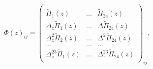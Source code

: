 \begin{equation}
\label{eq:Phidieuf2}
\Phi(z)_{ij}=\left(\begin{array}{ccc}\\
\tilde{\Pi}_1(z) & ... & \tilde{\Pi}_{24}(z) \\
\Delta_z \tilde{\Pi}_1(z) & ... & \Delta \tilde{\Pi}_{24}(z) \\
\Delta_z^2 \tilde{\Pi}_2(z) & ... & \Delta^2 \tilde{\Pi}_{24}(z) \\
... & ... & ... \\
\Delta_z^{23} \tilde{\Pi}_1(z) & ... & \Delta_z^{23} \tilde{\Pi}_{24}(z)\\
\end{array}\right)_{ij},
\end{equation} 
